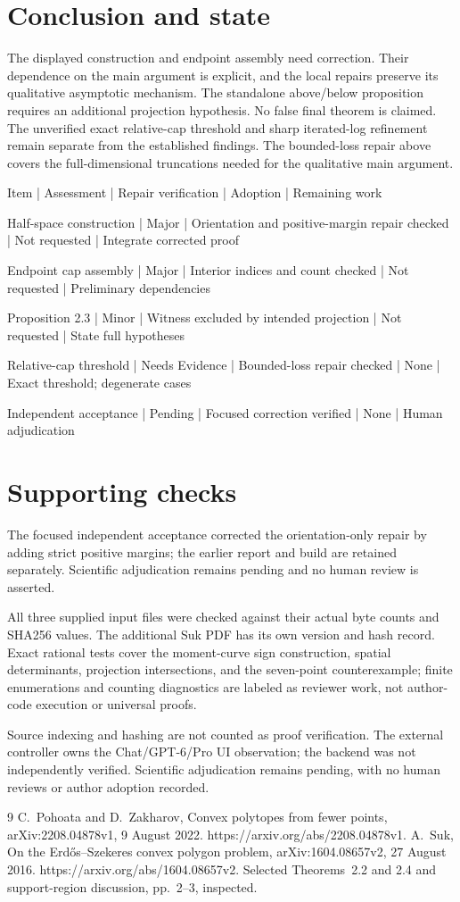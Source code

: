 \documentclass[10pt]{article}
\begin{document}
\section*{Conclusion and state}
The displayed construction and endpoint assembly need correction. Their dependence on the main argument is explicit, and the local repairs preserve its qualitative asymptotic mechanism. The standalone above/below proposition requires an additional projection hypothesis. No false final theorem is claimed. The unverified exact relative-cap threshold and sharp iterated-log refinement remain separate from the established findings. The bounded-loss repair above covers the full-dimensional truncations needed for the qualitative main argument.\par
Item | Assessment | Repair verification | Adoption | Remaining work\par
Half-space construction | Major | Orientation and positive-margin repair checked | Not requested | Integrate corrected proof\par
Endpoint cap assembly | Major | Interior indices and count checked | Not requested | Preliminary dependencies\par
Proposition 2.3 | Minor | Witness excluded by intended projection | Not requested | State full hypotheses\par
Relative-cap threshold | Needs Evidence | Bounded-loss repair checked | None | Exact threshold; degenerate cases\par
Independent acceptance | Pending | Focused correction verified | None | Human adjudication\par
\section*{Supporting checks}
The focused independent acceptance corrected the orientation-only repair by adding strict positive margins; the earlier report and build are retained separately. Scientific adjudication remains pending and no human review is asserted.\par
All three supplied input files were checked against their actual byte counts and SHA256 values. The additional Suk PDF has its own version and hash record. Exact rational tests cover the moment-curve sign construction, spatial determinants, projection intersections, and the seven-point counterexample; finite enumerations and counting diagnostics are labeled as reviewer work, not author-code execution or universal proofs.\par
Source indexing and hashing are not counted as proof verification. The external controller owns the Chat/GPT-6/Pro UI observation; the backend was not independently verified. Scientific adjudication remains pending, with no human reviews or author adoption recorded.\par
9 C. Pohoata and D. Zakharov, Convex polytopes from fewer points, arXiv:2208.04878v1, 9 August 2022. https://arxiv.org/abs/2208.04878v1. A. Suk, On the Erdős–Szekeres convex polygon problem, arXiv:1604.08657v2, 27 August 2016. https://arxiv.org/abs/1604.08657v2. Selected Theorems 2.2 and 2.4 and support-region discussion, pp. 2–3, inspected.\par
\end{document}
